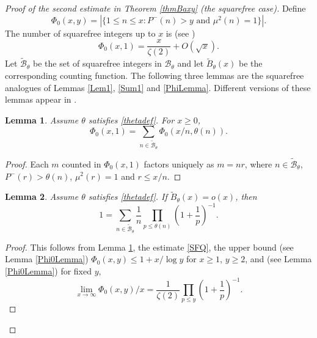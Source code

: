 \documentclass[11pt]{amsart}
\newtheorem{lemma}{Lemma}
\begin{document}
\begin{proof}[Proof of the second estimate in Theorem \ref{thmBaxy} (the squarefree case)]
Define
$$
\Phi_0(x,y) =| \{1\le n \le x: P^-(n)>y \text{ and } \mu^2(n)=1\}|.
$$
The number of squarefree integers up to $x$ is (see \cite[Exercise 44]{Ten})
\begin{equation}\label{SFQ}
\Phi_0(x,1) = \frac{x}{\zeta(2)}+O(\sqrt{x}).
\end{equation}
Let $\tilde{\mathcal{B}}_\theta$ be the set of squarefree integers in $\mathcal{B}_\theta$ and let $\tilde{B}_\theta(x)$ be the corresponding counting function. 
The following three lemmas are the squarefree analogues of Lemmas \ref{Lem1}, \ref{Sum1} and \ref{PhiLemma}.
Different versions of these lemmas appear in \cite[Lemmas 2.2, 2.3, 3.3, 3.5]{PTW}.
\begin{lemma}\label{Lem1sf}
Assume $\theta$ satisfies \eqref{thetadef}. For $x\ge 0$, 
$$
\Phi_0(x,1) = \sum_{n \in \tilde{\mathcal{B}}_\theta} \Phi_0(x/n, \theta(n)).
$$
\end{lemma}
\begin{proof}
Each $m$ counted in $\Phi_0(x,1)$ factors uniquely as $m=nr$, where $n\in \tilde{\mathcal{B}}_\theta$, $P^-(r)>\theta(n)$, $\mu^2(r)=1$ and $r\le x/n$. 
\end{proof}

\begin{lemma}\label{Sum1sf}
Assume $\theta$ satisfies \eqref{thetadef}.
If $\tilde{B}_\theta(x)=o(x)$, then 
$$ 1=\sum_{n \in \tilde{\mathcal{B}}_\theta} \frac{1}{n} \prod_{p\le \theta(n)} \left(1+\frac{1}{p}\right)^{-1}.$$
\end{lemma}
\begin{proof}
This follows from Lemma \ref{Lem1sf}, the estimate \eqref{SFQ}, the upper bound (see Lemma \ref{Phi0Lemma})
$\Phi_0(x,y) \le 1+x/\log y$ for $x\ge 1$, $y\ge 2$, and (see Lemma \ref{Phi0Lemma}) for fixed $y$,
$$
\lim_{x\to \infty}\Phi_0(x,y)/x = \frac{1}{\zeta(2)}\prod_{p\le y} \left(1+\frac{1}{p}\right)^{-1}.
$$
\end{proof}


\end{proof}
\end{document}
